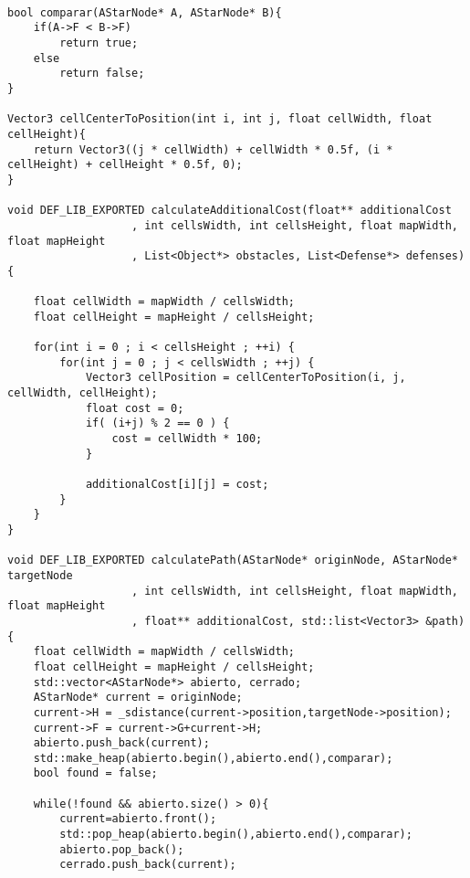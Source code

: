\begin{verbatim}

bool comparar(AStarNode* A, AStarNode* B){
    if(A->F < B->F)
		return true;
    else
		return false;
}

Vector3 cellCenterToPosition(int i, int j, float cellWidth, float cellHeight){ 
    return Vector3((j * cellWidth) + cellWidth * 0.5f, (i * cellHeight) + cellHeight * 0.5f, 0); 
}

void DEF_LIB_EXPORTED calculateAdditionalCost(float** additionalCost
                   , int cellsWidth, int cellsHeight, float mapWidth, float mapHeight
                   , List<Object*> obstacles, List<Defense*> defenses) {

    float cellWidth = mapWidth / cellsWidth;
    float cellHeight = mapHeight / cellsHeight;

    for(int i = 0 ; i < cellsHeight ; ++i) {
        for(int j = 0 ; j < cellsWidth ; ++j) {
            Vector3 cellPosition = cellCenterToPosition(i, j, cellWidth, cellHeight);
            float cost = 0;
            if( (i+j) % 2 == 0 ) {
                cost = cellWidth * 100;
            }
            
            additionalCost[i][j] = cost;
        }
    }
}

void DEF_LIB_EXPORTED calculatePath(AStarNode* originNode, AStarNode* targetNode
                   , int cellsWidth, int cellsHeight, float mapWidth, float mapHeight
                   , float** additionalCost, std::list<Vector3> &path) {
	float cellWidth = mapWidth / cellsWidth;
	float cellHeight = mapHeight / cellsHeight;
    std::vector<AStarNode*> abierto, cerrado;
    AStarNode* current = originNode;
    current->H = _sdistance(current->position,targetNode->position);
    current->F = current->G+current->H;
    abierto.push_back(current);
    std::make_heap(abierto.begin(),abierto.end(),comparar);
    bool found = false;

    while(!found && abierto.size() > 0){
        current=abierto.front();
        std::pop_heap(abierto.begin(),abierto.end(),comparar);
        abierto.pop_back();
        cerrado.push_back(current);
      

\end{verbatim}
